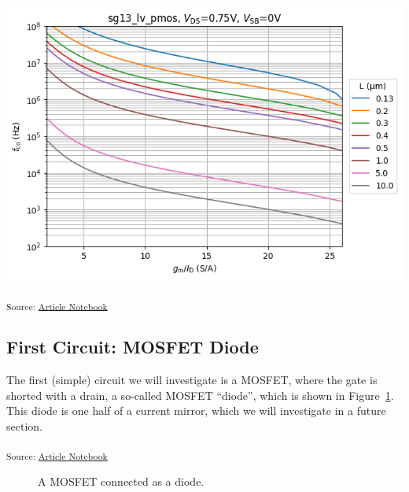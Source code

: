 \documentclass[
  a4paper,
  DIV=11,
  numbers=noendperiod]{scrartcl}
\begin{document}
\includegraphics{index_files/figure-latex/.-sizing-techsweep_sg13_plots_pmos-cell-14-output-1.png}

\textsubscript{Source:
\href{https://iic-jku.github.io/analog-circuit-design/index.qmd.html}{Article
Notebook}}

\subsection{First Circuit: MOSFET Diode}\label{sec-mosfet-diode}

The first (simple) circuit we will investigate is a MOSFET, where the
gate is shorted with a drain, a so-called MOSFET ``diode'', which is
shown in Figure~\ref{fig-mosfet-diode}. This diode is one half of a
current mirror, which we will investigate in a future section.

\textsubscript{Source:
\href{https://iic-jku.github.io/analog-circuit-design/index.qmd.html}{Article
Notebook}}

\begin{figure}[H]


\caption{\label{fig-mosfet-diode}A MOSFET connected as a diode.}

\end{figure}%
\end{document}
